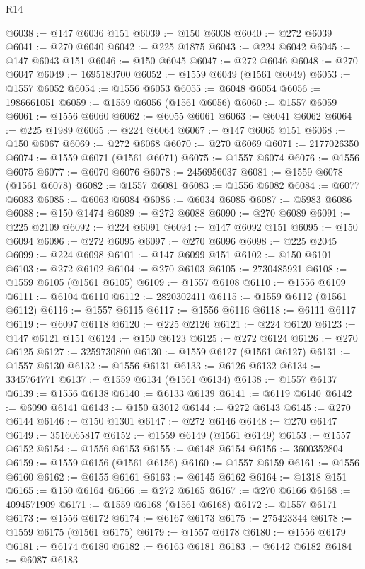 \begin{lexlean}{R14}
\begin{coremodule}
@6038 := @147 @6036 @151
@6039 := @150 @6038
@6040 := @272 @6039
@6041 := @270 @6040
@6042 := @225 @1875
@6043 := @224 @6042
@6045 := @147 @6043 @151
@6046 := @150 @6045
@6047 := @272 @6046
@6048 := @270 @6047
@6049 := 1695183700
@6052 := @1559 @6049 (@1561 @6049)
@6053 := @1557 @6052
@6054 := @1556 @6053
@6055 := @6048 @6054
@6056 := 1986661051
@6059 := @1559 @6056 (@1561 @6056)
@6060 := @1557 @6059
@6061 := @1556 @6060
@6062 := @6055 @6061
@6063 := @6041 @6062
@6064 := @225 @1989
@6065 := @224 @6064
@6067 := @147 @6065 @151
@6068 := @150 @6067
@6069 := @272 @6068
@6070 := @270 @6069
@6071 := 2177026350
@6074 := @1559 @6071 (@1561 @6071)
@6075 := @1557 @6074
@6076 := @1556 @6075
@6077 := @6070 @6076
@6078 := 2456956037
@6081 := @1559 @6078 (@1561 @6078)
@6082 := @1557 @6081
@6083 := @1556 @6082
@6084 := @6077 @6083
@6085 := @6063 @6084
@6086 := @6034 @6085
@6087 := @5983 @6086
@6088 := @150 @1474
@6089 := @272 @6088
@6090 := @270 @6089
@6091 := @225 @2109
@6092 := @224 @6091
@6094 := @147 @6092 @151
@6095 := @150 @6094
@6096 := @272 @6095
@6097 := @270 @6096
@6098 := @225 @2045
@6099 := @224 @6098
@6101 := @147 @6099 @151
@6102 := @150 @6101
@6103 := @272 @6102
@6104 := @270 @6103
@6105 := 2730485921
@6108 := @1559 @6105 (@1561 @6105)
@6109 := @1557 @6108
@6110 := @1556 @6109
@6111 := @6104 @6110
@6112 := 2820302411
@6115 := @1559 @6112 (@1561 @6112)
@6116 := @1557 @6115
@6117 := @1556 @6116
@6118 := @6111 @6117
@6119 := @6097 @6118
@6120 := @225 @2126
@6121 := @224 @6120
@6123 := @147 @6121 @151
@6124 := @150 @6123
@6125 := @272 @6124
@6126 := @270 @6125
@6127 := 3259730800
@6130 := @1559 @6127 (@1561 @6127)
@6131 := @1557 @6130
@6132 := @1556 @6131
@6133 := @6126 @6132
@6134 := 3345764771
@6137 := @1559 @6134 (@1561 @6134)
@6138 := @1557 @6137
@6139 := @1556 @6138
@6140 := @6133 @6139
@6141 := @6119 @6140
@6142 := @6090 @6141
@6143 := @150 @3012
@6144 := @272 @6143
@6145 := @270 @6144
@6146 := @150 @1301
@6147 := @272 @6146
@6148 := @270 @6147
@6149 := 3516065817
@6152 := @1559 @6149 (@1561 @6149)
@6153 := @1557 @6152
@6154 := @1556 @6153
@6155 := @6148 @6154
@6156 := 3600352804
@6159 := @1559 @6156 (@1561 @6156)
@6160 := @1557 @6159
@6161 := @1556 @6160
@6162 := @6155 @6161
@6163 := @6145 @6162
@6164 := @1318 @151
@6165 := @150 @6164
@6166 := @272 @6165
@6167 := @270 @6166
@6168 := 4094571909
@6171 := @1559 @6168 (@1561 @6168)
@6172 := @1557 @6171
@6173 := @1556 @6172
@6174 := @6167 @6173
@6175 := 275423344
@6178 := @1559 @6175 (@1561 @6175)
@6179 := @1557 @6178
@6180 := @1556 @6179
@6181 := @6174 @6180
@6182 := @6163 @6181
@6183 := @6142 @6182
@6184 := @6087 @6183

\end{coremodule}
\end{lexlean}
